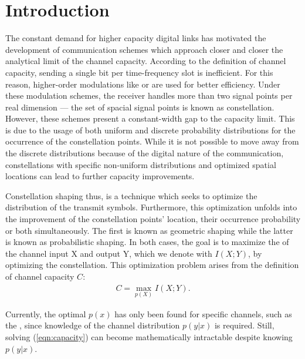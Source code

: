 \chapter{Introduction}\label{chap:introduction}

The constant demand for higher capacity digital links has motivated the development of communication schemes which approach closer and closer the analytical limit of the channel capacity. According to the definition of channel capacity, sending a single bit per time-frequency slot is inefficient. For this reason, higher-order modulations like  or  are used for better efficiency. Under these modulation schemes, the receiver handles more than two signal points per real dimension --- the set of spacial signal points is known as constellation. However, these schemes present a constant-width gap to the capacity limit. This is due to the usage of both uniform and discrete probability distributions for the occurrence of the constellation points. While it is not possible to move away from the discrete distributions because of the digital nature of the communication, constellations with specific non-uniform distributions and optimized spatial locations can lead to further capacity improvements. 

Constellation shaping thus, is a technique which seeks to optimize the distribution of the transmit symbols. Furthermore, this optimization unfolds into the improvement of the constellation points' location, their occurrence probability or both simultaneously. The first is known as geometric shaping while the latter is known as probabilistic shaping. In both cases, the goal is to maximize the  of the channel input X and output Y, which we denote with $I(X;Y)$, by optimizing the constellation. This optimization problem arises from the definition of channel capacity $C$:
\begin{align}
\label{eqn:capacity}
	C = \max_{p(X)} I(X;Y).
\end{align}

Currently, the optimal $p(x)$ has only been found for specific channels, such as the , since knowledge of the channel distribution $p(y|x)$ is required. Still, solving (\ref{eqn:capacity}) can become mathematically intractable despite knowing $p(y|x)$.

